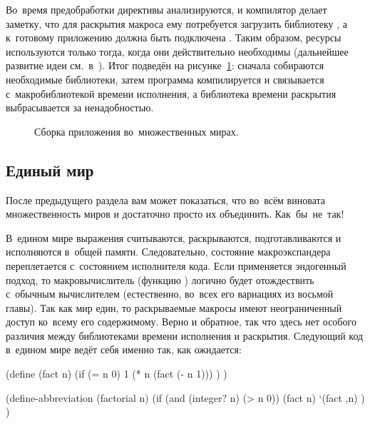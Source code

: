 Во~время предобработки директивы анализируются, и компилятор делает заметку, что
для раскрытия макроса  ему потребуется загрузить библиотеку
, а к~готовому приложению должна быть подключена .
Таким образом, ресурсы используются только тогда, когда они
действительно необходимы (дальнейшее развитие идеи см.~в~\cite{dps94b}). Итог
подведён на рисунке~\ref{macros/define/multiple/exogeny/pic:lib-compile}:
сначала собираются необходимые библиотеки, затем программа компилируется и
связывается с~макробиблиотекой времени исполнения, а библиотека времени
раскрытия выбрасывается за ненадобностью.

\begin{figure}[tb]
\centering

\caption{Сборка приложения во~множественных мирах.}%
\label{macros/define/multiple/exogeny/pic:lib-compile}
\end{figure}


\subsection{Единый мир}\label{macros/define/ssect:unique}

После предыдущего раздела вам может показаться, что во~всём виновата
множественность миров и достаточно просто их объединить. Как~бы~не~так!

В~едином мире выражения считываются, раскрываются, подготавливаются и
исполняются в~общей памяти. Следовательно, состояние макроэкспандера
переплетается с~состоянием исполнителя кода. Если применяется эндогенный подход,
то макровычислитель (функцию ) логично будет отождествить
с~обычным вычислителем  (естественно, во~всех его вариациях из восьмой
главы).  Так как мир един, то раскрываемые макросы
имеют неограниченный доступ ко~всему его содержимому. Верно и обратное, так что
здесь нет особого различия между библиотеками времени исполнения и раскрытия.
Следующий код в~едином мире ведёт себя именно так, как ожидается:

\begin{code:lisp}
(define (fact n)
  (if (= n 0) 1
      (* n (fact (- n 1))) ) )

(define-abbreviation (factorial n)
  (if (and (integer? n) (> n 0))
      (fact n)
      `(fact ,n) ) )
\end{code:lisp}

